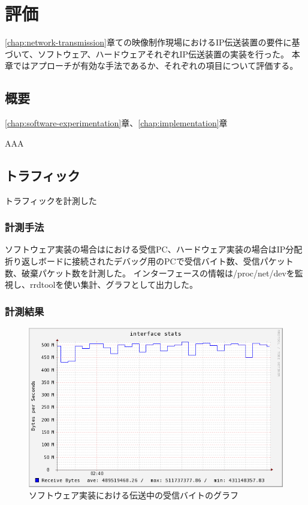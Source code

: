 \chapter{評価}
\label{chap:evaluation}

\ref{chap:network-transmission}章ての映像制作現場におけるIP伝送装置の要件に基づいて、ソフトウェア、ハードウェアそれぞれIP伝送装置の実装を行った。
本章ではアプローチが有効な手法であるか、それぞれの項目について評価する。

\section{概要}

\ref{chap:software-experimentation}章、\ref{chap:implementation}章

AAA

\section{トラフィック}

トラフィックを計測した

\subsection{計測手法}

ソフトウェア実装の場合はにおける受信PC、ハードウェア実装の場合はIP分配折り返しボードに接続されたデバッグ用のPCで受信バイト数、受信パケット数、破棄パケット数を計測した。
インターフェースの情報は/proc/net/devを監視し、rrdtoolを使い集計、グラフとして出力した。

\subsection{計測結果}

\begin{figure}[htbp]
  \begin{center}
    \includegraphics[bb=0 0 597 374,width=12cm]{img/lo-bytes-graph.png}
  \end{center}
  \caption{ソフトウェア実装における伝送中の受信バイトのグラフ}
  \label{fig:lo-bytes-graph}
\end{figure}

